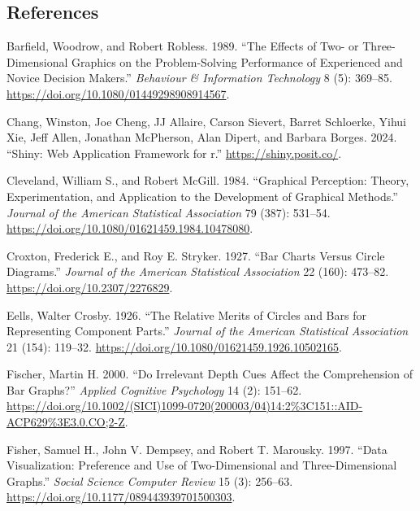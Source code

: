 \documentclass[
  letterpaper,
  DIV=11,
  numbers=noendperiod]{scrartcl}
\newlength{\cslhangindent}
\newenvironment{CSLReferences}[2] %
 {\begin{list}{}{%
  \setlength{\itemindent}{0pt}
  \setlength{\leftmargin}{0pt}
  \setlength{\parsep}{0pt}
  \ifodd #1
   \setlength{\leftmargin}{\cslhangindent}
   \setlength{\itemindent}{-1\cslhangindent}
  \fi
  \setlength{\itemsep}{#2\baselineskip}}}
 {\end{list}}
\providecommand{\DIFaddend}{} %
\DeclareRobustCommand{\DIFaddend}{\DIFOaddend \let\includegraphics\DIFOincludegraphics} %
\begin{document}
\DIFaddend \newpage

\subsection{References}\label{references}

\label{refs}
\begin{CSLReferences}{1}{0}
Barfield, Woodrow, and Robert Robless. 1989. {``The Effects of Two- or
Three-Dimensional Graphics on the Problem-Solving Performance of
Experienced and Novice Decision Makers.''} \emph{Behaviour \&
Information Technology} 8 (5): 369--85.
\url{https://doi.org/10.1080/01449298908914567}.

Chang, Winston, Joe Cheng, JJ Allaire, Carson Sievert, Barret Schloerke,
Yihui Xie, Jeff Allen, Jonathan McPherson, Alan Dipert, and Barbara
Borges. 2024. {``Shiny: Web Application Framework for r.''}
\url{https://shiny.posit.co/}.

Cleveland, William S., and Robert McGill. 1984. {``Graphical Perception:
Theory, Experimentation, and Application to the Development of Graphical
Methods.''} \emph{Journal of the American Statistical Association} 79
(387): 531--54. \url{https://doi.org/10.1080/01621459.1984.10478080}.

Croxton, Frederick E., and Roy E. Stryker. 1927. {``Bar Charts Versus
Circle Diagrams.''} \emph{Journal of the American Statistical
Association} 22 (160): 473--82. \url{https://doi.org/10.2307/2276829}.

Eells, Walter Crosby. 1926. {``The Relative Merits of Circles and Bars
for Representing Component Parts.''} \emph{Journal of the American
Statistical Association} 21 (154): 119--32.
\url{https://doi.org/10.1080/01621459.1926.10502165}.

Fischer, Martin H. 2000. {``Do Irrelevant Depth Cues Affect the
Comprehension of Bar Graphs?''} \emph{Applied Cognitive Psychology} 14
(2): 151--62.
\url{https://doi.org/10.1002/(SICI)1099-0720(200003/04)14:2\%3C151::AID-ACP629\%3E3.0.CO;2-Z}.

Fisher, Samuel H., John V. Dempsey, and Robert T. Marousky. 1997.
{``Data Visualization: Preference and Use of Two-Dimensional and
Three-Dimensional Graphs.''} \emph{Social Science Computer Review} 15
(3): 256--63. \url{https://doi.org/10.1177/089443939701500303}.


\end{CSLReferences}
\end{document}
